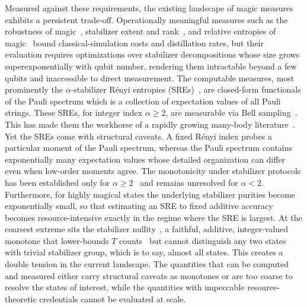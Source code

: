 \documentclass[aps,pra,superscriptaddress,twocolumn,longbibliography]{revtex4-2}
\begin{document}
Measured against these requirements, the existing landscape of magic measures exhibits a persistent trade-off. Operationally meaningful measures such as the robustness of magic~\cite{Howard/RoM/2017,Heinrich/RoM_Fast/2019,Hamaguchi/RoM_practical/2024}, stabilizer extent and rank~\cite{PhysRevX.6.021043,Bravyi/stab_fidelity/2019}, and relative entropies of magic~\cite{Veitch_2014,PRXQuantum.2.010345,BGJ_PNAS2023_QuantumEntropy,Rubboli2024mixedstate,Tarabunga_2025_QST} bound classical-simulation costs and distillation rates, but their evaluation requires optimizations over stabilizer decompositions whose size grows superexponentially with qubit number, rendering them intractable beyond a few qubits and inaccessible to direct measurement. 
The computable measures, most prominently the $\alpha$-stabilizer R\'enyi entropies (SREs)~\cite{Leone/Stab_Renyi/2022}, are closed-form functionals of the Pauli spectrum which is a collection of expectation values of all Pauli strings.
These SREs, for integer index $\alpha\geq2$, are measurable via Bell sampling~\cite{Haug/Scalable_measures/2023,Tobias/Pauli_sampling/2024}. This has made them the workhorse of a rapidly growing many-body literature~\cite{Oliviero/IsingModelMagic/2022,Tarabunga/magic_via_PauliMarkovChains/2023,Turkeshi/MagicSpreading/2025,Sierant/FermionicMagic/2026}. Yet the SREs come with structural caveats.
A fixed R{\'e}nyi index probes a particular moment of the Pauli spectrum, whereas the Pauli spectrum contains exponentially many expectation values whose detailed organization can differ even when low-order moments agree.
The monotonicity under stabilizer protocols has been established only for $\alpha\geq2$~\cite{Leone/Stab_Renyi_monotone/2024} and remains unresolved for $\alpha<2$. 
Furthermore, for highly magical states the underlying stabilizer purities become exponentially small, so that estimating an SRE to fixed additive accuracy becomes resource-intensive exactly in the regime where the SRE is largest. At the coarsest extreme sits the stabilizer nullity~\cite{Beverland/Pauli_Spectrum/2020}, a faithful, additive, integer-valued monotone that lower-bounds $T$ counts~\cite{Jiang/T_cont_vs_nnullity/2023} but cannot distinguish any two states with trivial stabilizer group, which is to say, almost all states. 
This creates a double tension in the current landscape.
The quantities that can be computed and measured either carry structural caveats as monotones or are too coarse to resolve the states of interest, while the quantities with impeccable resource-theoretic credentials cannot be evaluated at scale.
\end{document}
